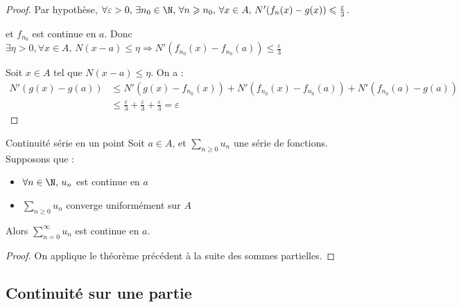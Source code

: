 \begin{proof}
    Par hypothèse, $\forall \varepsilon > 0, \, \exists n_0 \in \N, \, \forall n \geqslant n_0, \, \forall x \in A, \, N'(f_n(x) - g(x)) \leqslant \frac \varepsilon 3$.

    et $f_{n_0}$ est continue en $a$. Donc $\exists \eta > 0, \forall x \in A, \, N(x - a) \leqslant \eta \Rightarrow N'(f_{n_0}(x) - f_{n_0}(a)) \leqslant \frac \varepsilon 3$

    Soit $x \in A$ tel que $N(x - a) \leqslant \eta$. On a :
    \begin{align}
        N'(g(x) - g(a)) & \leqslant N'(g(x) - f_{n_0}(x)) + N'(f_{n_0}(x) - f_{n_0}(a)) + N'(f_{n_0}(a) - g(a)) \\
        & \leqslant \frac \varepsilon 3 + \frac \varepsilon 3 + \frac \varepsilon 3 = \varepsilon
    \end{align}
\end{proof}

\begin{theoreme}{Continuité série en un point}{}
    Soit $a \in A$, et $\displaystyle \sum_{n \geqslant 0} u_n$ une série de fonctions. Supposons que : 
    \begin{itemize}
        \item $\forall n \in \N, \, u_n$ est continue en $a$
        \item $\displaystyle \sum_{n \geqslant 0} u_n$ converge uniformément sur $A$ 
    \end{itemize}
    Alors $\displaystyle \sum_{n = 0}^{\infty} u_n$ est continue en $a$.
\end{theoreme}

\begin{proof}
    On applique le théorème précédent à la suite des sommes partielles.
\end{proof}

\subsection{Continuité sur une partie }

